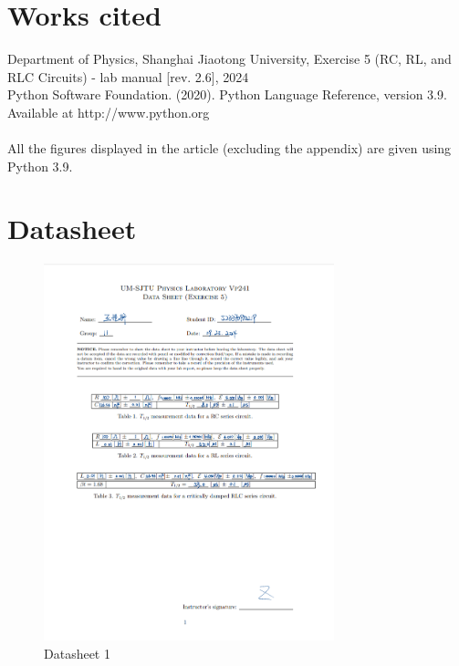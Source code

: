 \documentclass[12pt, a4paper, oneside]{article}
\begin{document}
\section{Works cited}
Department of Physics, Shanghai Jiaotong University, Exercise 5 (RC, RL, and RLC Circuits) - lab manual [rev. 2.6], 2024\\
Python Software Foundation. (2020). Python Language Reference, version 3.9. Available at http://www.python.org\\
\\
All the figures displayed in the article (excluding the appendix) are given using Python 3.9.
\pagebreak
\appendix
\section{Datasheet}

\begin{figure}[htbp]
	\centering
	\includegraphics[width=0.75\textwidth]{D1.png}
	\caption{Datasheet 1}
\end{figure}
\end{document}
